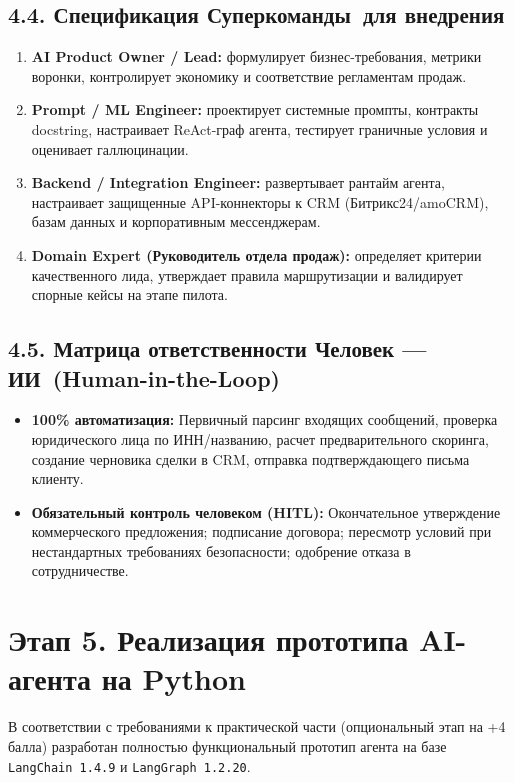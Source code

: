 \documentclass[12pt,a4paper]{article}
\begin{document}
	\subsection*{4.4. Спецификация \guillemotleft Суперкоманды\guillemotright\ для внедрения}
	\begin{enumerate}[noitemsep,topsep=2pt]
		\item \textbf{AI Product Owner / Lead:} формулирует бизнес-требования, метрики воронки, контролирует экономику и соответствие регламентам продаж.
		\item \textbf{Prompt / ML Engineer:} проектирует системные промпты, контракты docstring, настраивает ReAct-граф агента, тестирует граничные условия и оценивает галлюцинации.
		\item \textbf{Backend / Integration Engineer:} развертывает рантайм агента, настраивает защищенные API-коннекторы к CRM (Битрикс24/amoCRM), базам данных и корпоративным мессенджерам.
		\item \textbf{Domain Expert (Руководитель отдела продаж):} определяет критерии качественного лида, утверждает правила маршрутизации и валидирует спорные кейсы на этапе пилота.
	\end{enumerate}

	\subsection*{4.5. Матрица ответственности \guillemotleft Человек --- ИИ\guillemotright\ (Human-in-the-Loop)}
	\begin{itemize}[noitemsep,topsep=1pt]
		\item \textbf{100\% автоматизация:} Первичный парсинг входящих сообщений, проверка юридического лица по ИНН/названию, расчет предварительного скоринга, создание черновика сделки в CRM, отправка подтверждающего письма клиенту.
		\item \textbf{Обязательный контроль человеком (HITL):} Окончательное утверждение коммерческого предложения; подписание договора; пересмотр условий при нестандартных требованиях безопасности; одобрение отказа в сотрудничестве.
	\end{itemize}

	\section*{Этап 5. Реализация прототипа AI-агента на Python}
	
	В соответствии с требованиями к практической части (опциональный этап на +4 балла) разработан полностью функциональный прототип агента на базе \texttt{LangChain 1.4.9} и \texttt{LangGraph 1.2.20}.
\end{document}
